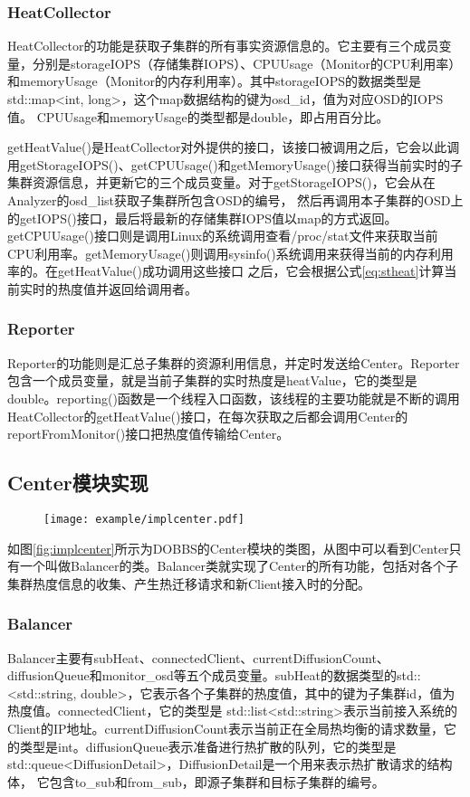 \subsubsection{HeatCollector}
HeatCollector的功能是获取子集群的所有事实资源信息的。它主要有三个成员变量，分别是storageIOPS（存储集群IOPS）、CPUUsage（Monitor的CPU利用率）和memoryUsage（Monitor的内存利用率）。其中storageIOPS的数据类型是std::map<int, long>，这个map数据结构的键为osd\_id，值为对应OSD的IOPS值。
CPUUsage和memoryUsage的类型都是double，即占用百分比。

getHeatValue()是HeatCollector对外提供的接口，该接口被调用之后，它会以此调用getStorageIOPS()、getCPUUsage()和getMemoryUsage()接口获得当前实时的子集群资源信息，并更新它的三个成员变量。对于getStorageIOPS()，它会从在Analyzer的osd\_list获取子集群所包含OSD的编号，
然后再调用本子集群的OSD上的getIOPS()接口，最后将最新的存储集群IOPS值以map的方式返回。getCPUUsage()接口则是调用Linux的系统调用查看/proc/stat文件来获取当前CPU利用率。getMemoryUsage()则调用sysinfo()系统调用来获得当前的内存利用率的。在getHeatValue()成功调用这些接口
之后，它会根据公式\ref{eq:stheat}计算当前实时的热度值并返回给调用者。

\subsubsection{Reporter}
Reporter的功能则是汇总子集群的资源利用信息，并定时发送给Center。Reporter包含一个成员变量，就是当前子集群的实时热度是heatValue，它的类型是double。reporting()函数是一个线程入口函数，该线程的主要功能就是不断的调用HeatCollector的getHeatValue()接口，在每次获取之后都会调用Center的reportFromMonitor()接口把热度值传输给Center。

\subsection{Center模块实现}

\begin{figure}[!htp]
    \centering
    \texttt{[image: example/implcenter.pdf]}
\end{figure}

如图\ref{fig:implcenter}所示为DOBBS的Center模块的类图，从图中可以看到Center只有一个叫做Balancer的类。Balancer类就实现了Center的所有功能，包括对各个子集群热度信息的收集、产生热迁移请求和新Client接入时的分配。

\subsubsection{Balancer}
Balancer主要有subHeat、connectedClient、currentDiffusionCount、diffusionQueue和monitor\_osd等五个成员变量。subHeat的数据类型的std::<std::string, double>，它表示各个子集群的热度值，其中的键为子集群id，值为热度值。connectedClient，它的类型是
std::list<std::string>表示当前接入系统的Client的IP地址。currentDiffusionCount表示当前正在全局热均衡的请求数量，它的类型是int。diffusionQueue表示准备进行热扩散的队列，它的类型是std::queue<DiffusionDetail>，DiffusionDetail是一个用来表示热扩散请求的结构体，
它包含to\_sub和from\_sub，即源子集群和目标子集群的编号。

